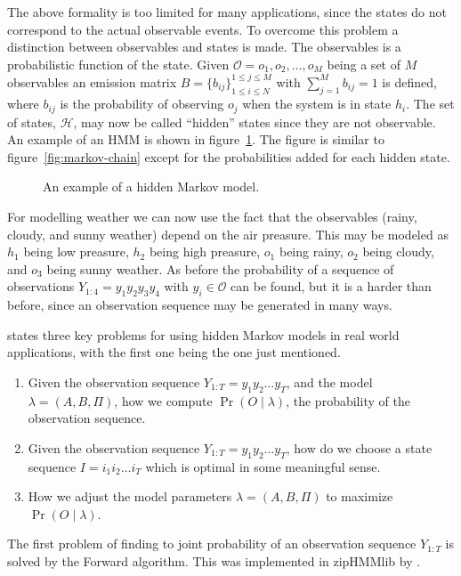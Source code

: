 The above formality is too limited for many applications, since the states do
not correspond to the actual observable events. To overcome this problem a
distinction between observables and states is made. The observables is a
probabilistic function of the state. Given
$\mathcal{O} = {o_1, o_2, \dots, o_M}$ being a set of $M$ observables an
emission matrix $B = {\{b_{ij}\}}_{1 \le i \le N}^{1 \le j \le M}$ with
$\sum_{j=1}^M b_{ij} = 1$ is defined, where $b_{ij}$ is the probability of
observing $o_j$ when the system is in state $h_i$. The set of states,
$\mathcal{H}$, may now be called ``hidden'' states since they are not
observable. An example of an HMM is shown in
figure~\ref{fig:hidden-markov-model}. The figure is similar to
figure~\ref{fig:markov-chain} except for the probabilities added for each
hidden state.

\begin{figure}
  \centering
  
  \caption{An example of a hidden Markov model.}
  \label{fig:hidden-markov-model}
\end{figure}

For modelling weather we can now use the fact that the observables (rainy,
cloudy, and sunny weather) depend on the air preasure. This may be modeled as
$h_1$ being low preasure, $h_2$ being high preasure, $o_1$ being rainy, $o_2$
being cloudy, and $o_3$ being sunny weather. As before the probability of a
sequence of observations $Y_{1:4} = y_1y_2y_3y_4$ with $y_i \in \mathcal{O}$
can be found, but it is a harder than before, since an observation sequence may be
generated in many ways.

\citet{rabiner1989tutorial} states three key problems for using hidden Markov
models in real world applications, with the first one being the one just
mentioned.
\begin{enumerate}
\item Given the observation sequence $Y_{1:T} = y_1y_2\dots{}y_T$, and the
  model $\lambda = (A, B, \Pi)$, how we compute $\Pr(O \mid \lambda)$, the
  probability of the observation sequence.
\item Given the observation sequence $Y_{1:T} = y_1y_2\dots{}y_T$, how do we
  choose a state sequence $I = i_1i_2\dots{}i_T$ which is optimal in some
  meaningful sense.
\item How we adjust the model parameters $\lambda = (A, B, \Pi)$ to maximize
  $\Pr(O \mid \lambda)$.
\end{enumerate}

The first problem of finding to joint probability of an observation sequence
$Y_{1:T}$ is solved by the Forward algorithm. This was implemented in zipHMMlib
by \citet{sand2013ziphmmlib}.

